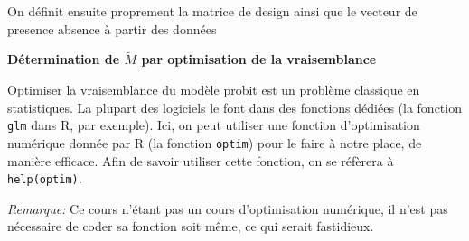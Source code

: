 \documentclass[]{article}
\newenvironment{Shaded}{\begin{snugshade}}{\end{snugshade}}
\newcommand{\CommentTok}[1]{\textcolor[rgb]{0.56,0.35,0.01}{\textit{#1}}}
\newcommand{\DataTypeTok}[1]{\textcolor[rgb]{0.13,0.29,0.53}{#1}}
\newcommand{\DecValTok}[1]{\textcolor[rgb]{0.00,0.00,0.81}{#1}}
\newcommand{\KeywordTok}[1]{\textcolor[rgb]{0.13,0.29,0.53}{\textbf{#1}}}
\newcommand{\NormalTok}[1]{#1}
\newcommand{\OperatorTok}[1]{\textcolor[rgb]{0.81,0.36,0.00}{\textbf{#1}}}
\newcommand{\OtherTok}[1]{\textcolor[rgb]{0.56,0.35,0.01}{#1}}
\newcommand{\StringTok}[1]{\textcolor[rgb]{0.31,0.60,0.02}{#1}}
\newenvironment{Correction}%
  { \vspace{\baselineskip}\begin{mdframed}[backgroundcolor=my_green]}%
  {\end{mdframed}}
\begin{document}
\begin{Correction}
On définit ensuite proprement la matrice de design ainsi que le vecteur de presence absence à partir des données
\end{Correction}

\begin{Shaded}
\end{Shaded}

\begin{Correction}
\textbf{Détermination de $\tilde{M}$ par optimisation de la vraisemblance}

Optimiser la vraisemblance du modèle probit est un problème classique en statistiques. 
La plupart des logiciels le font dans des fonctions dédiées (la fonction \texttt{glm} dans R, par exemple).
Ici, on peut utiliser une fonction d'optimisation numérique donnée par R (la fonction \texttt{optim}) pour le faire à notre place, de manière efficace. 
Afin de savoir utiliser cette fonction, on se réfèrera à \texttt{help(optim)}.


\textit{Remarque: } Ce cours n'étant pas un cours d'optimisation numérique, il n'est pas nécessaire de coder sa fonction soit même, ce qui serait fastidieux.
\end{Correction}
\end{document}
